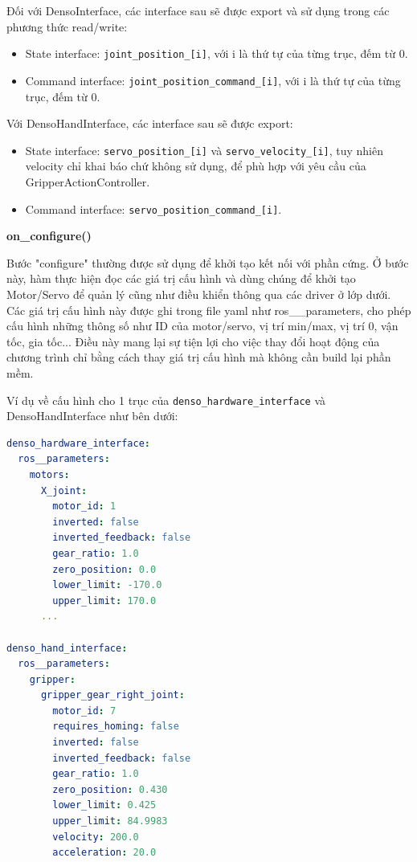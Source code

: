 Đối với DensoInterface, các interface sau sẽ được export và sử dụng trong các phương thức read/write:
\begin{itemize}
    \item State interface: \lstinline[style=inlinecode]{joint_position_[i]}, với i là thứ tự của từng trục, đếm từ 0.
    \item Command interface: \lstinline[style=inlinecode]{joint_position_command_[i]}, với i là thứ tự của từng trục, đếm từ 0.
\end{itemize}

Với DensoHandInterface, các interface sau sẽ được export:
\begin{itemize}
    \item State interface: \lstinline[style=inlinecode]{servo_position_[i]} và \lstinline[style=inlinecode]{servo_velocity_[i]}, tuy nhiên velocity chỉ khai báo chứ không sử dụng, để phù hợp với yêu cầu của GripperActionController. 
    \item Command interface: \lstinline[style=inlinecode]{servo_position_command_[i]}.
\end{itemize}


\textbf{on\_configure()}

Bước "configure" thường được sử dụng để khởi tạo kết nối với phần cứng. Ở bước này, hàm thực hiện đọc các giá trị cấu hình và dùng chúng để khởi tạo Motor/Servo để quản lý cũng như điều khiển thông qua các driver ở lớp dưới. Các giá trị cấu hình này được ghi trong file yaml như ros\_\_parameters, cho phép cấu hình những thông số như ID của motor/servo, vị trí min/max, vị trí 0, vận tốc, gia tốc... Điều này mang lại sự tiện lợi cho việc thay đổi hoạt động của chương trình chỉ bằng cách thay giá trị cấu hình mà không cần build lại phần mềm.

Ví dụ về cấu hình cho 1 trục của \lstinline[style=inlinecode]{denso_hardware_interface} và DensoHandInterface như bên dưới:

\begin{lstlisting}[language=yaml]
denso_hardware_interface:
  ros__parameters:
    motors:
      X_joint:
        motor_id: 1
        inverted: false           
        inverted_feedback: false 
        gear_ratio: 1.0
        zero_position: 0.0
        lower_limit: -170.0     
        upper_limit: 170.0      
      ...

denso_hand_interface:
  ros__parameters: 
    gripper:
      gripper_gear_right_joint:
        motor_id: 7
        requires_homing: false
        inverted: false                 
        inverted_feedback: false        
        gear_ratio: 1.0
        zero_position: 0.430
        lower_limit: 0.425             
        upper_limit: 84.9983           
        velocity: 200.0 
        acceleration: 20.0
\end{lstlisting}

